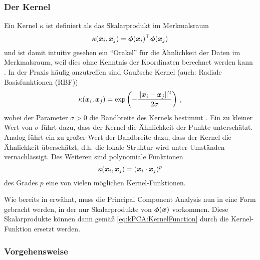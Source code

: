 \subsubsection{Der Kernel}
\label{ch:MethodenDerDimRed:statistisch:kPCA:KernelFunktion}

Ein Kernel $\kappa$ ist definiert als das Skalarprodukt im Merkmalsraum \parencite[34]{ShaweTaylor.2011}
\begin{equation}
	\label{eq:kPCA:KernelFunction}
	\kappa(\bm{x}_i, \bm{x}_j) = \bm{\phi}(\bm{x}_i)^\top \bm{\phi}(\bm{x}_j)
\end{equation}
und ist damit intuitiv gesehen ein \enquote{Orakel} für die Ähnlichkeit der Daten im Merkmalsraum, weil dies ohne Kenntnis der Koordinaten berechnet werden kann \parencite[71]{ShaweTaylor.2011}. In der Praxis häufig anzutreffen sind Gaußsche Kernel (auch: Radiale
Basisfunktionen (RBF))
\begin{equation}
	\kappa(\bm{x}_i, \bm{x}_j) = \exp \left(- \frac{\lVert \bm{x}_i - \bm{x}_j\rVert^2}{2\sigma}\right) \, ,
\end{equation}
wobei der Parameter $\sigma > 0$ die Bandbreite des Kernels bestimmt \parencite[296]{ShaweTaylor.2011}. Ein zu kleiner Wert von $\sigma$ führt dazu, dass der Kernel die
Ähnlichkeit der Punkte unterschätzt. Analog führt ein zu großer Wert der Bandbreite dazu, dass der
Kernel die Ähnlichkeit überschätzt, d.h. die lokale Struktur wird unter Umständen vernachlässigt.
Des Weiteren sind polynomiale Funktionen \parencite[292]{ShaweTaylor.2011}
\begin{equation}
	\kappa(\bm{x}_i, \bm{x}_j) = (\bm{x}_i \cdot \bm{x}_j)^p
\end{equation}
des Grades $p$ eine von vielen möglichen Kernel-Funktionen.

Wie bereits in  erwähnt, muss die
Principal Component Analysis nun in eine Form gebracht werden, in der nur Skalarprodukte von
$\bm{\phi}(\bm{x})$ vorkommen. Diese Skalarprodukte können dann gemäß
\eqref{eq:kPCA:KernelFunction} durch die Kernel-Funktion ersetzt werden.

\subsubsection{Vorgehensweise}
\label{ch:MethodenDerDimRed:statistisch:kPCA:Vorgehensweise}


